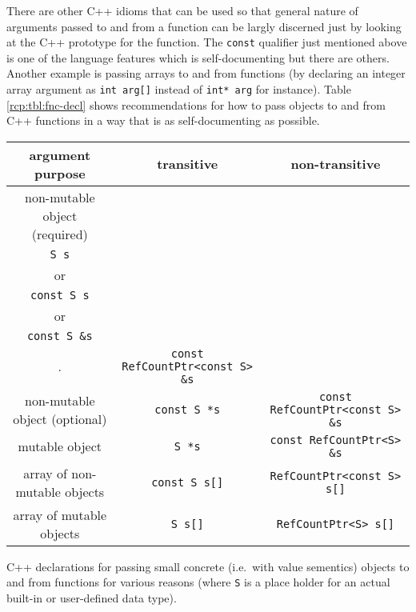 There are other C++ idioms that can be used so that general nature of
arguments passed to and from a function can be largly discerned just
by looking at the C++ prototype for the function.  The
{}\texttt{const} qualifier just mentioned above is one of the language
features which is self-documenting but there are others.  Another
example is passing arrays to and from functions (by declaring an
integer array argument as {}\texttt{int arg[]} instead of
{}\texttt{int* arg} for instance).  Table {}\ref{rcp:tbl:fnc-decl}
shows recommendations for how to pass objects to and from C++
functions in a way that is as self-documenting as possible.

\begin{table}
%
\begin{minipage}{{}\textwidth}
\begin{tabular}{|c|c|c|}
\hline
argument purpose
& transitive
& non-transitive \\
\hline
non-mutable object (required)
& \begin{minipage}{12ex}
    \begin{center}
    {\tiny .}\\
    {}\texttt{S s} \\
    or \\
    {}\texttt{const S s} \\
    or \\
    {}\texttt{const S \&s} \\
    {\tiny .}
    \end{center}
  \end{minipage}
& {}\texttt{const RefCountPtr<const S> \&s} \\
\hline
non-mutable object (optional)
& {}\texttt{const S *s}
& {}\texttt{const RefCountPtr<const S> \&s} \\
\hline
mutable object
& {}\texttt{S *s}
& {}\texttt{const RefCountPtr<S> \&s} \\
\hline
array of non-mutable objects
& {}\texttt{const S s[]}
& {}\texttt{RefCountPtr<const S> s[]} \\
\hline
array of mutable objects
& {}\texttt{S s[]}
& {}\texttt{RefCountPtr<S> s[]} \\
\hline
\end{tabular}
\begin{center}
C++ declarations for passing small concrete (i.e.~with value
sementics) objects to and from functions for various reasons (where
{}\texttt{S} is a place holder for an actual built-in or user-defined
data type).
\end{center}

\end{minipage}
\end{table}

